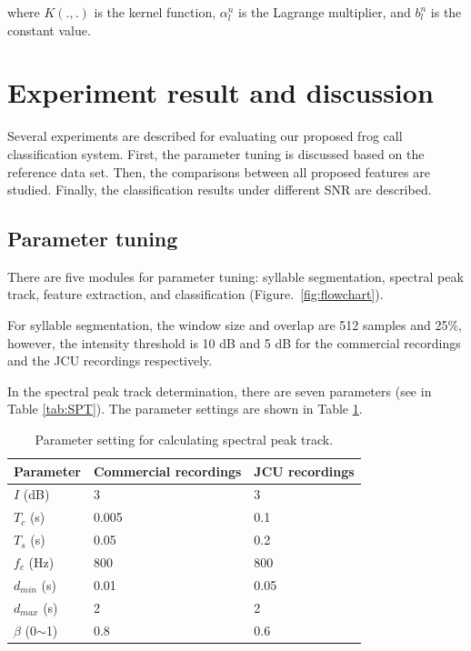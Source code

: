 where $K(.,.)$ is the kernel function, $\alpha_{l}^{n}$ is the Lagrange multiplier, and $b_{l}^{n}$ is the constant value. 
\section{Experiment result and discussion}
Several experiments are described for evaluating our proposed frog call classification system. First, the parameter tuning is discussed based on the reference data set. Then, the comparisons between all proposed features are studied. Finally, the classification results under different SNR are described.

\subsection{Parameter tuning}
There are five modules for parameter tuning: syllable segmentation, spectral peak track, feature extraction, and classification (Figure.~\ref{fig:flowchart}). 

For syllable segmentation, the window size and overlap are 512 samples and 25\%, however, the intensity threshold is 10 dB and 5 dB for the commercial recordings and the JCU recordings respectively.


In the spectral peak track determination, there are seven parameters (see in Table \ref{tab:SPT}). The parameter settings are shown in Table \ref{tab:value}.
\begin{table}[htb!]
\centering
\caption{Parameter setting for calculating spectral peak track.}
\label{tab:value}
\begin{tabular}{lll}
\hline
\textbf{Parameter} & \textbf{Commercial recordings} & \textbf{JCU recordings} \\ \hline\hline
   $I$ (dB)        & 3             & 3             \\ 
    $T_{c}$ (s)        & 0.005         & 0.1           \\ 
  $T_{s}$ (s)        & 0.05          & 0.2           \\ 
      $f_{c}$ (Hz)        & 800           & 800           \\ 
   $d_{min}$ (s)         & 0.01          & 0.05          \\ 
     $d_{max}$ (s)        & 2             & 2             \\ 
     $\beta$ (0$\sim$1)          & 0.8           & 0.6           \\ \hline\hline
\end{tabular}
\end{table}
                              

